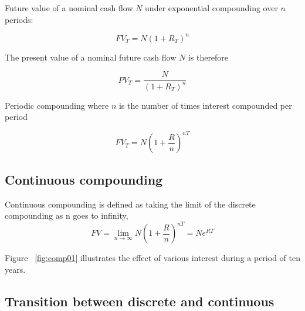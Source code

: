 \documentclass[11pt,a4paper]{article}
\numberwithin{equation}{section}
\begin{document}
Future value of a nominal cash flow $N$ under exponential compounding over
$n$ periods:

\[ FV_T = N(1+R_T)^n \]

The present value of a nominal future cash flow $N$ is therefore

\[ PV_T = \frac{N}{(1+R_T)^n} \]

Periodic compounding where $n$ is the number of times interest compounded per period

\[ 
FV_T=N\left( 1 + \frac{R}{n}  \right)^{nT}
\]

\subsection{Continuous compounding}
Continuous compounding is defined as taking the limit of the discrete compounding as n goes to infinity,
\[ 
FV=\lim_{n \to \infty} N \left(1+\frac{R}{n}\right)^{nT}=Ne^{RT}
\]


Figure ~\ref{fig:comp01} illustrates the effect of various interest during a period of ten years.

\begin{minipage}{\linewidth}
\label{fig:comp01}
\end{minipage}

\subsection{Transition between discrete and continuous}
\end{document}
